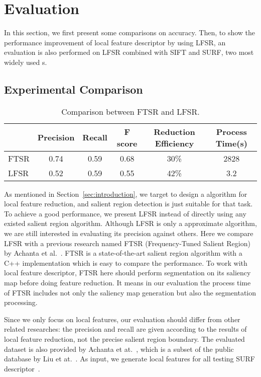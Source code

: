 \section{Evaluation}
\label{sec:evaluation}

In this section, we first present some comparisons on accuracy. Then, to show the performance improvement of local feature descriptor by using LFSR, an evaluation is also performed on LFSR combined with SIFT and SURF, two most widely used {\lfea}s.

\subsection{Experimental Comparison}
\label{sec:evaluation_comparison}

\begin{table*}[!t]
\begin{center}
\begin{tabular}{|l|c|c|c|c|c|}
\hline
 & Precision & Recall & F score & Reduction Efficiency & Process Time(s) \\
\hline\hline
FTSR & 0.74 & 0.59 & 0.68 & 30\% & 2828 \\
LFSR & 0.52 & 0.59 & 0.55 & 42\% & 3.2 \\
\hline
\end{tabular}
\end{center}
\caption{Comparison between FTSR and LFSR.}
\label{tab:comparison}
\end{table*}

As mentioned in Section~\ref{sec:introduction}, we target to design a algorithm for local feature reduction, and salient region detection is just suitable for that task. To achieve a good performance, we present LFSR instead of directly using any existed salient region algorithm. Although LFSR is only a approximate algorithm, we are still interested in evaluating its precision against others. Here we compare LFSR with a previous research named FTSR (Frequency-Tuned Salient Region) by Achanta et al.~\cite{achanta2009frequency}. FTSR is a state-of-the-art salient region algorithm with a C++ implementation which is easy to compare the performance. To work with local feature descriptor, FTSR here should perform segmentation on its saliency map before doing feature reduction. It means in our evaluation the process time of FTSR includes not only the saliency map generation but also the segmentation processing.

Since we only focus on local features, our evaluation should differ from other related researches: the precision and recall are given according to the results of local feature reduction, not the precise salient region boundary. The evaluated dataset is also provided by Achanta et at.~\cite{achanta2009frequency}, which is a subset of the public database by Liu et at.~\cite{liu2011learning}. As input, we generate local features for all testing SURF descriptor~\cite{evans2010opensurf}. 

